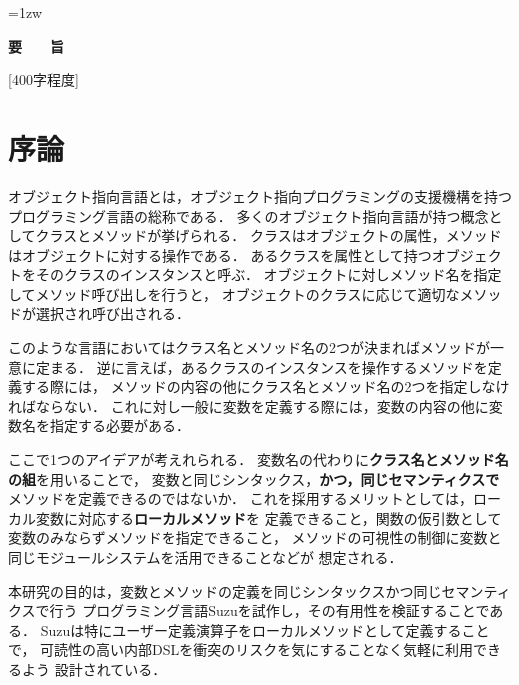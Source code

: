 \documentclass[a4paper,11pt,dvipdfmx]{jreport}
\title{\Underline{レキシカル環境にメソッドを定義する\\オブジェクト指向言語Suzu}}
\author{林 拓人}
\begin{document}
\maketitle
\thispagestyle{empty}
\newpage

\thispagestyle{empty}
\vspace*{20pt plus 1fil}
\parindent=1zw
\noindent
\begin{center}
{\Large \bf 要　　旨}
\vspace{2cm}
\end{center}
[400字程度]

\par
\vspace{0pt plus 1fil}
\newpage

\tableofcontents

\pagebreak \setcounter{page}{1}


\chapter{序論}

オブジェクト指向言語とは，オブジェクト指向プログラミングの支援機構を持つ
プログラミング言語の総称である．
多くのオブジェクト指向言語が持つ概念としてクラスとメソッドが挙げられる．
クラスはオブジェクトの属性，メソッドはオブジェクトに対する操作である．
あるクラスを属性として持つオブジェクトをそのクラスのインスタンスと呼ぶ．
オブジェクトに対しメソッド名を指定してメソッド呼び出しを行うと，
オブジェクトのクラスに応じて適切なメソッドが選択され呼び出される．

このような言語においてはクラス名とメソッド名の2つが決まればメソッドが一意に定まる．
逆に言えば，あるクラスのインスタンスを操作するメソッドを定義する際には，
メソッドの内容の他にクラス名とメソッド名の2つを指定しなければならない．
これに対し一般に変数を定義する際には，変数の内容の他に変数名を指定する必要がある．

ここで1つのアイデアが考えれられる．
変数名の代わりに\textbf{クラス名とメソッド名の組}を用いることで，
変数と同じシンタックス，\textbf{かつ，同じセマンティクスで}
メソッドを定義できるのではないか．
これを採用するメリットとしては，ローカル変数に対応する\textbf{ローカルメソッド}を
定義できること，関数の仮引数として変数のみならずメソッドを指定できること，
メソッドの可視性の制御に変数と同じモジュールシステムを活用できることなどが
想定される．

本研究の目的は，変数とメソッドの定義を同じシンタックスかつ同じセマンティクスで行う
プログラミング言語Suzuを試作し，その有用性を検証することである．
Suzuは特にユーザー定義演算子をローカルメソッドとして定義することで，
可読性の高い内部DSLを衝突のリスクを気にすることなく気軽に利用できるよう
設計されている．
\end{document}
